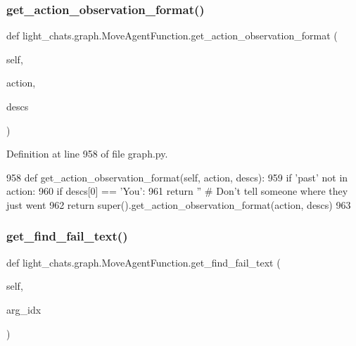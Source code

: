 \subsubsection{\texorpdfstring{get\+\_\+action\+\_\+observation\+\_\+format()}{get\_action\_observation\_format()}}
{\footnotesize\ttfamily def light\+\_\+chats.\+graph.\+Move\+Agent\+Function.\+get\+\_\+action\+\_\+observation\+\_\+format (\begin{DoxyParamCaption}\item[{}]{self,  }\item[{}]{action,  }\item[{}]{descs }\end{DoxyParamCaption})}



Definition at line 958 of file graph.\+py.


\begin{DoxyCode}
958     \textcolor{keyword}{def }get\_action\_observation\_format(self, action, descs):
959         \textcolor{keywordflow}{if} \textcolor{stringliteral}{'past'} \textcolor{keywordflow}{not} \textcolor{keywordflow}{in} action:
960             \textcolor{keywordflow}{if} descs[0] == \textcolor{stringliteral}{'You'}:
961                 \textcolor{keywordflow}{return} \textcolor{stringliteral}{''}  \textcolor{comment}{# Don't tell someone where they just went}
962         \textcolor{keywordflow}{return} super().get\_action\_observation\_format(action, descs)
963 
\end{DoxyCode}
\mbox{\label{classlight__chats_1_1graph_1_1MoveAgentFunction_a94bbc9319ec6a1a5229ded76406bfc58}} 
\subsubsection{\texorpdfstring{get\+\_\+find\+\_\+fail\+\_\+text()}{get\_find\_fail\_text()}}
{\footnotesize\ttfamily def light\+\_\+chats.\+graph.\+Move\+Agent\+Function.\+get\+\_\+find\+\_\+fail\+\_\+text (\begin{DoxyParamCaption}\item[{}]{self,  }\item[{}]{arg\+\_\+idx }\end{DoxyParamCaption})}



